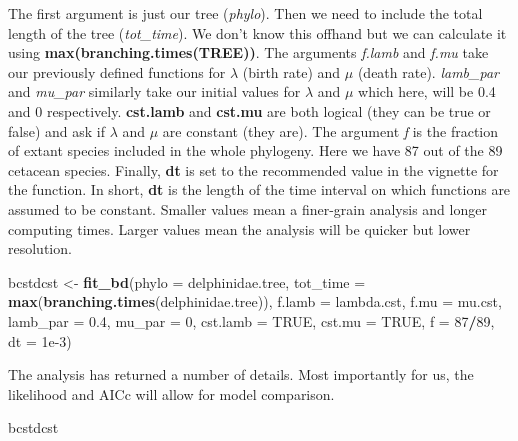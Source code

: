 \documentclass[
]{book}
\newenvironment{Shaded}{\begin{snugshade}}{\end{snugshade}}
\newcommand{\DataTypeTok}[1]{\textcolor[rgb]{0.13,0.29,0.53}{#1}}
\newcommand{\DecValTok}[1]{\textcolor[rgb]{0.00,0.00,0.81}{#1}}
\newcommand{\FloatTok}[1]{\textcolor[rgb]{0.00,0.00,0.81}{#1}}
\newcommand{\KeywordTok}[1]{\textcolor[rgb]{0.13,0.29,0.53}{\textbf{#1}}}
\newcommand{\NormalTok}[1]{#1}
\newcommand{\OperatorTok}[1]{\textcolor[rgb]{0.81,0.36,0.00}{\textbf{#1}}}
\newcommand{\OtherTok}[1]{\textcolor[rgb]{0.56,0.35,0.01}{#1}}
\newcommand{\StringTok}[1]{\textcolor[rgb]{0.31,0.60,0.02}{#1}}
\begin{document}
The first argument is just our tree (\emph{phylo}). Then we need to include the total length of the tree (\emph{tot\_time}). We don't know this offhand but we can calculate it using \textbf{max(branching.times(TREE))}. The arguments \emph{f.lamb} and \emph{f.mu} take our previously defined functions for \(\lambda\) (birth rate) and \(\mu\) (death rate). \emph{lamb\_par} and \emph{mu\_par} similarly take our initial values for \(\lambda\) and \(\mu\) which here, will be 0.4 and 0 respectively. \textbf{cst.lamb} and \textbf{cst.mu} are both logical (they can be true or false) and ask if \(\lambda\) and \(\mu\) are constant (they are). The argument \emph{f} is the fraction of extant species included in the whole phylogeny. Here we have 87 out of the 89 cetacean species. Finally, \textbf{dt} is set to the recommended value in the vignette for the function. In short, \textbf{dt} is the length of the time interval on which functions are assumed to be constant. Smaller values mean a finer-grain analysis and longer computing times. Larger values mean the analysis will be quicker but lower resolution.

\begin{Shaded}
\begin{Highlighting}[]
\NormalTok{bcstdcst \textless{}{-}}\StringTok{ }\KeywordTok{fit\_bd}\NormalTok{(}\DataTypeTok{phylo =}\NormalTok{ delphinidae.tree, }
                   \DataTypeTok{tot\_time =} \KeywordTok{max}\NormalTok{(}\KeywordTok{branching.times}\NormalTok{(delphinidae.tree)),}
                   \DataTypeTok{f.lamb =}\NormalTok{ lambda.cst, }\DataTypeTok{f.mu =}\NormalTok{ mu.cst,}
                   \DataTypeTok{lamb\_par =} \FloatTok{0.4}\NormalTok{, }\DataTypeTok{mu\_par =} \DecValTok{0}\NormalTok{,}
                   \DataTypeTok{cst.lamb =} \OtherTok{TRUE}\NormalTok{, }\DataTypeTok{cst.mu =} \OtherTok{TRUE}\NormalTok{,}
                   \DataTypeTok{f =} \DecValTok{87}\OperatorTok{/}\DecValTok{89}\NormalTok{, }\DataTypeTok{dt =} \FloatTok{1e{-}3}\NormalTok{)}
\end{Highlighting}
\end{Shaded}

The analysis has returned a number of details. Most importantly for us, the likelihood and AICc will allow for model comparison.

\begin{Shaded}
\begin{Highlighting}[]
\NormalTok{bcstdcst}
\end{Highlighting}
\end{Shaded}
\end{document}
